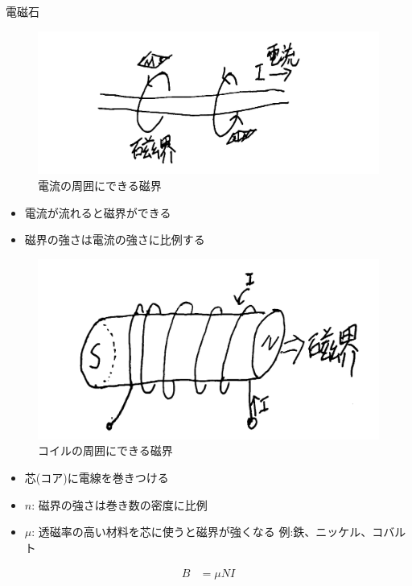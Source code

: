 \begin{multicols}{3}
        \begin{itembox}[l]{電磁石}
            \begin{figure}[H]
                \centering
                \includegraphics[width=0.6\linewidth]{fig/電線と磁界.png}
                \caption{電流の周囲にできる磁界}
                \label{fig:current_magnet}
            \end{figure}
            \begin{itemize}
                \item 電流が流れると磁界ができる
                \item 磁界の強さは電流の強さに比例する
            \end{itemize}
            \begin{figure}[H]
                \centering
                \includegraphics[width=0.6\linewidth]{fig/コイルと磁界.png}
                \caption{コイルの周囲にできる磁界}
                \label{fig:coil_magnet}
            \end{figure}
            \begin{itemize}
                \item 芯(コア)に電線を巻きつける
                \item $n$: 磁界の強さは巻き数の密度に比例
                \item $\mu$:  透磁率の高い材料を芯に使うと磁界が強くなる
                \newline 例:鉄、ニッケル、コバルト
            \end{itemize}
            \begin{align}
                    B &= \mu NI
            \end{align}
        \end{itembox}


\end{multicols}
